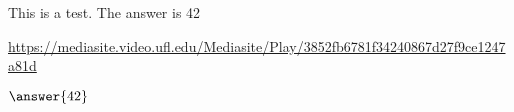 \documentclass[•]{ximera}
\begin{document}
\begin{problem}

This is a test.  The answer is 42

\begin{hint}
\url{https://mediasite.video.ufl.edu/Mediasite/Play/3852fb6781f34240867d27f9ce1247a81d}
\end{hint}

$\answer{42}$

\end{problem}
\end{document}
